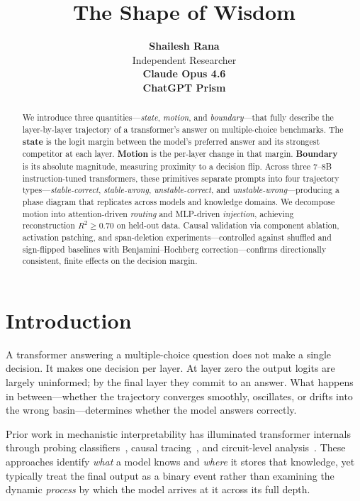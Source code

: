 \documentclass{article}
\title{The Shape of Wisdom}
\author{%
  \textbf{Shailesh Rana} \\
  Independent Researcher \\
  \And
  \textbf{Claude Opus 4.6} \\
  \And
  \textbf{ChatGPT Prism} \\
}
\begin{document}
\maketitle

\begin{abstract}
We introduce three quantities---\emph{state}, \emph{motion}, and \emph{boundary}---that fully describe the layer-by-layer trajectory of a transformer's answer on multiple-choice benchmarks.
The \textbf{state} is the logit margin between the model's preferred answer and its strongest competitor at each layer.
\textbf{Motion} is the per-layer change in that margin.
\textbf{Boundary} is its absolute magnitude, measuring proximity to a decision flip.
Across three 7--8B instruction-tuned transformers, these primitives separate prompts into four trajectory types---\emph{stable-correct}, \emph{stable-wrong}, \emph{unstable-correct}, and \emph{unstable-wrong}---producing a phase diagram that replicates across models and knowledge domains.
We decompose motion into attention-driven \emph{routing} and MLP-driven \emph{injection}, achieving reconstruction $R^2 \geq 0.70$ on held-out data.
Causal validation via component ablation, activation patching, and span-deletion experiments---controlled against shuffled and sign-flipped baselines with Benjamini--Hochberg correction---confirms directionally consistent, finite effects on the decision margin.
\end{abstract}

\section{Introduction}

A transformer answering a multiple-choice question does not make a single decision.  It makes one decision per layer.  At layer zero the output logits are largely uninformed; by the final layer they commit to an answer.  What happens in between---whether the trajectory converges smoothly, oscillates, or drifts into the wrong basin---determines whether the model answers correctly.

Prior work in mechanistic interpretability has illuminated transformer internals through probing classifiers~\cite{belinkov2022}, causal tracing~\cite{meng2022}, and circuit-level analysis~\cite{olsson2022,conmy2023}.
These approaches identify \emph{what} a model knows and \emph{where} it stores that knowledge, yet typically treat the final output as a binary event rather than examining the dynamic \emph{process} by which the model arrives at it across its full depth.
\end{document}
